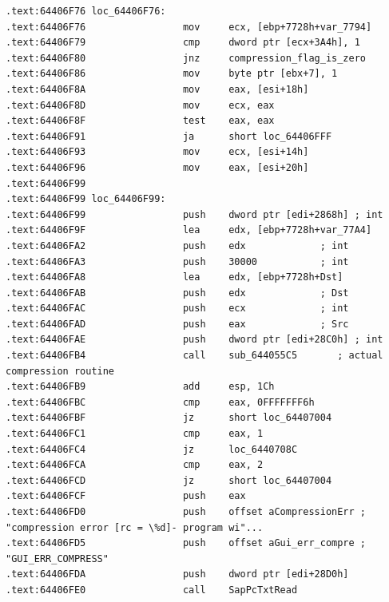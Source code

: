 \begin{lstlisting}
.text:64406F76 loc_64406F76:
.text:64406F76                 mov     ecx, [ebp+7728h+var_7794]
.text:64406F79                 cmp     dword ptr [ecx+3A4h], 1
.text:64406F80                 jnz     compression_flag_is_zero
.text:64406F86                 mov     byte ptr [ebx+7], 1
.text:64406F8A                 mov     eax, [esi+18h]
.text:64406F8D                 mov     ecx, eax
.text:64406F8F                 test    eax, eax
.text:64406F91                 ja      short loc_64406FFF
.text:64406F93                 mov     ecx, [esi+14h]
.text:64406F96                 mov     eax, [esi+20h]
.text:64406F99
.text:64406F99 loc_64406F99:
.text:64406F99                 push    dword ptr [edi+2868h] ; int
.text:64406F9F                 lea     edx, [ebp+7728h+var_77A4]
.text:64406FA2                 push    edx             ; int
.text:64406FA3                 push    30000           ; int
.text:64406FA8                 lea     edx, [ebp+7728h+Dst]
.text:64406FAB                 push    edx             ; Dst
.text:64406FAC                 push    ecx             ; int
.text:64406FAD                 push    eax             ; Src
.text:64406FAE                 push    dword ptr [edi+28C0h] ; int
.text:64406FB4                 call    sub_644055C5       ; actual compression routine
.text:64406FB9                 add     esp, 1Ch
.text:64406FBC                 cmp     eax, 0FFFFFFF6h
.text:64406FBF                 jz      short loc_64407004
.text:64406FC1                 cmp     eax, 1
.text:64406FC4                 jz      loc_6440708C
.text:64406FCA                 cmp     eax, 2
.text:64406FCD                 jz      short loc_64407004
.text:64406FCF                 push    eax
.text:64406FD0                 push    offset aCompressionErr ; "compression error [rc = \%d]- program wi"...
.text:64406FD5                 push    offset aGui_err_compre ; "GUI_ERR_COMPRESS"
.text:64406FDA                 push    dword ptr [edi+28D0h]
.text:64406FE0                 call    SapPcTxtRead
\end{lstlisting}



